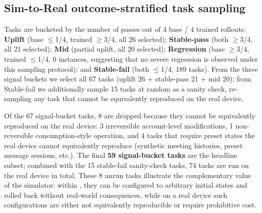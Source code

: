 \begin{table}[!htbp]
  \centering\small
  \setlength{\tabcolsep}{3pt}
  \caption{Sim-to-Real training gain on the simulation side, broken down by difficulty (256-task test set)}
  \label{tab:sim2real-by-level}
\end{table}

\subsection{Sim-to-Real outcome-stratified task sampling}\label{app:sim2real-buckets}

Tasks are bucketed by the number of passes out of 4 base / 4 trained rollouts: \textbf{Uplift} (base $\leq$1/4, trained $\geq$3/4, all 26 selected); \textbf{Stable-pass} (both $\geq$3/4, all 21 selected); \textbf{Mid} (partial uplift, all 20 selected); \textbf{Regression} (base $\geq$3/4, trained $\leq$1/4, 0 instances, suggesting that no severe regression is observed under this sampling protocol); and \textbf{Stable-fail} (both $\leq$1/4, 189 tasks). From the three signal buckets we select all 67 tasks (uplift 26 + stable-pass 21 + mid 20); from Stable-fail we additionally sample 15 tasks at random as a sanity check, re-sampling any task that cannot be equivalently reproduced on the real device.

Of the 67 signal-bucket tasks, 8 are dropped because they cannot be equivalently reproduced on the real device: 3 irreversible account-level modifications, 1 non-reversible consumption-style operation, and 4 tasks that require preset states the real device cannot equivalently reproduce (synthetic meeting histories, preset message sessions, etc.). The final \textbf{59 signal-bucket tasks} are the headline subset; combined with the 15 stable-fail sanity-check tasks, 74 tasks are run on the real device in total. These 8 unrun tasks illustrate the complementary value of the simulator: within \sys{}, they can be configured to arbitrary initial states and rolled back without real-world consequences, while on a real device such configurations are either not equivalently reproducible or require prohibitive cost.

